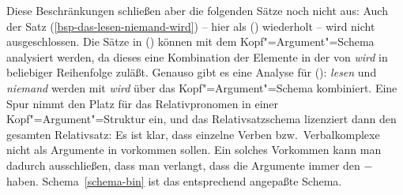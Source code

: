 Diese Beschränkungen schließen aber die folgenden Sätze noch nicht aus:
\eal
{}
\zl
Auch der Satz (\ref{bsp-das-lesen-niemand-wird}) -- hier als () wiederholt --
wird nicht ausgeschlossen.
\z
Die Sätze in () können mit dem Kopf"=Argument"=Schema analysiert werden,
da dieses eine Kombination der Elemente in der \subcatl von \emph{wird} in beliebiger
Reihenfolge zuläßt. Genauso gibt es eine Analyse für (): \emph{lesen} und \emph{niemand}
werden mit \emph{wird} über das Kopf"=Argument"=Schema kombiniert. Eine Spur nimmt den Platz
für das Relativpronomen in einer Kopf"=Argument"=Struktur ein, und das Relativsatzschema lizenziert
dann den gesamten Relativsatz:
\z
Es ist klar, dass einzelne Verben bzw.\ Verbalkomplexe nicht als Argumente in \kasen
vorkommen sollen. Ein solches Vorkommen kann man dadurch ausschließen, dass man verlangt,
dass die Argumente immer den \lexw $-$ haben. Schema~\ref{schema-bin} ist
das entsprechend angepaßte Schema.

\begin{samepage}
\begin{schema}
\label{schema-bin}
 \impl\\
\onems{
      synsem$|$loc$|$cat$|$subcat \ibox{1} $\oplus$ \ibox{3}\\
      head-dtr$|$cat$|$subcat \ibox{1} $\oplus$ \sliste{ \ibox{2} } $\oplus$ \ibox{3} \\
      non-head-dtrs \sliste{ [ \synsem  \ibox{2} \textrm{[\textsc{lex}  $-$ ]} ] }\\
}
\end{schema}
\end{samepage}

